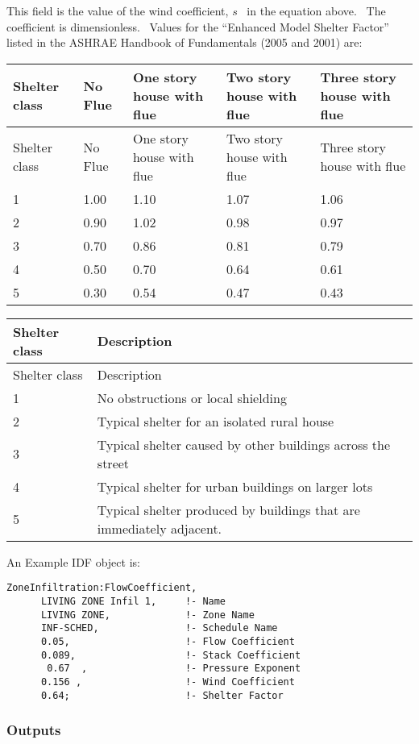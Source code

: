 This field is the value of the wind coefficient, \(s\) ~in the equation above.~ The coefficient is dimensionless.~ Values for the ``Enhanced Model Shelter Factor'' listed in the ASHRAE Handbook of Fundamentals (2005 and 2001) are:

\begin{longtable}[c]{@{}lllll@{}}
\toprule
Shelter class & No Flue & One story house with flue & Two story house with flue & Three story house with flue \tabularnewline
\midrule
\endfirsthead

\toprule
Shelter class & No Flue & One story house with flue & Two story house with flue & Three story house with flue \tabularnewline
\midrule
\endhead

1 & 1.00 & 1.10 & 1.07 & 1.06 \tabularnewline
2 & 0.90 & 1.02 & 0.98 & 0.97 \tabularnewline
3 & 0.70 & 0.86 & 0.81 & 0.79 \tabularnewline
4 & 0.50 & 0.70 & 0.64 & 0.61 \tabularnewline
5 & 0.30 & 0.54 & 0.47 & 0.43 \tabularnewline
\bottomrule
\end{longtable}

\begin{longtable}[c]{p{1.5in}p{4.5in}}
\toprule
Shelter class & Description \tabularnewline
\midrule
\endfirsthead

\toprule
Shelter class & Description \tabularnewline
\midrule
\endhead

1 & No obstructions or local shielding \tabularnewline
2 & Typical shelter for an isolated rural house \tabularnewline
3 & Typical shelter caused by other buildings across the street \tabularnewline
4 & Typical shelter for urban buildings on larger lots \tabularnewline
5 & Typical shelter produced by buildings that are immediately adjacent. \tabularnewline
\bottomrule
\end{longtable}

An Example IDF object is:

\begin{lstlisting}
ZoneInfiltration:FlowCoefficient,
      LIVING ZONE Infil 1,     !- Name
      LIVING ZONE,             !- Zone Name
      INF-SCHED,               !- Schedule Name
      0.05,                    !- Flow Coefficient
      0.089,                   !- Stack Coefficient
       0.67  ,                 !- Pressure Exponent
      0.156 ,                  !- Wind Coefficient
      0.64;                    !- Shelter Factor
\end{lstlisting}

\subsubsection{Outputs}\label{outputs-003}

